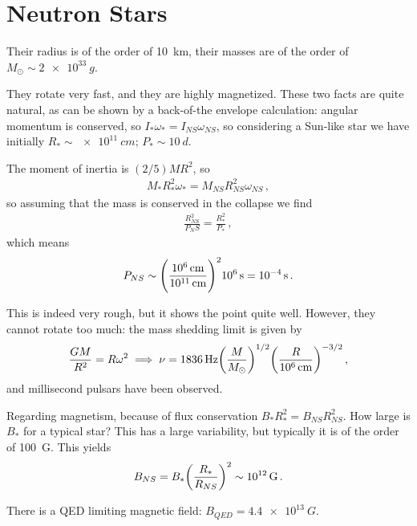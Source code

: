 \documentclass[main.tex]{subfiles}
\begin{document}
\chapter{Neutron Stars}


Their radius is of the order of \SI{10}{km}, their masses are of the order of \(M_{\odot} \sim \SI{2e33}{g}\). 

They rotate very fast, and they are highly magnetized. 
These two facts are quite natural, as can be shown by a back-of-the envelope calculation: angular momentum is conserved, so \(I_* \omega _* = I_{NS } \omega _{NS}\), so considering a Sun-like star we have initially \(R_* \sim \SI{e11}{cm}\); \(P_* \sim \SI{10}{d}\). 

The moment of inertia is \((2/5) M R^2\), so 
%
\begin{align}
M_* R_*^2 \omega _* = M_{NS} R_{NS}^2 \omega _{NS}
\,,
\end{align}
%
so assuming that the mass is conserved in the collapse we find 
%
\begin{align}
\frac{R_{NS}^2}{P_NS} =
\frac{R_{*}^2}{P_*}
\,,
\end{align}
%
which means 
%
\begin{align}
P_{NS} \sim \qty(\frac{\SI{e6}{cm}}{\SI{e11}{cm}})^2 \SI{e6}{s} = \SI{e-4}{s}
\,.
\end{align}

This is indeed very rough, but it shows the point quite well. 
However, they cannot rotate too much: the mass shedding limit is given by 
%
\begin{align}
\frac{GM}{R^2} = R \omega^2 \implies \nu = \SI{1836}{Hz}  \qty(\frac{M}{M_{\odot}})^{1/2}  \qty( \frac{R}{\SI{e6}{cm}})^{-3/2}  
\,,
\end{align}
%
and millisecond pulsars have been observed.

Regarding magnetism, because of flux conservation \(B_* R_*^2 = B_{NS} R_{NS}^2\). How large is \(B_*\) for a typical star?
This has a large variability, but typically it is of the order of \SI{100}{G}. 
This yields 
%
\begin{align}
B_{NS} = B_* \qty(\frac{R_*}{R_{NS}})^2 \sim \SI{e12}{G}
\,.
\end{align}

There is a QED limiting magnetic field: \(B_{QED} = \SI{4.4e13}{G}\).
\end{document}
